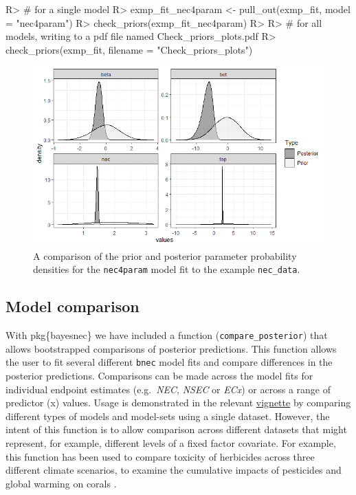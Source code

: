 \documentclass[
]{jss}
\begin{document}
\begin{CodeChunk}
\begin{CodeInput}
R> # for a single model
R> exmp_fit_nec4param <- pull_out(exmp_fit, model = "nec4param")
R> check_priors(exmp_fit_nec4param)
R> 
R> # for all models, writing to a pdf file named Check_priors_plots.pdf
R> check_priors(exmp_fit, filename = "Check_priors_plots")
\end{CodeInput}
\end{CodeChunk}

\begin{figure}
\centering
\includegraphics{check_prior.png}
\caption{A comparison of the prior and posterior parameter probability
densities for the \texttt{nec4param} model fit to the example
\texttt{nec\_data}.\label{fig:checkpriorsplot}}
\end{figure}

\hypertarget{model-comparison}{%
\subsection{Model comparison}\label{model-comparison}}

With pkg\{bayesnec\} we have included a function
(\texttt{compare\_posterior}) that allows bootstrapped comparisons of
posterior predictions. This function allows the user to fit several
different \texttt{bnec} model fits and compare differences in the
posterior predictions. Comparisons can be made across the model fits for
individual endpoint estimates (e.g.~\emph{NEC}, \emph{NSEC} or
\emph{ECx}) or across a range of predictor (x) values. Usage is
demonstrated in the relevant
\href{https://open-aims.github.io/bayesnec/articles/example4.html}{vignette}
by comparing different types of models and model-sets using a single
dataset. However, the intent of this function is to allow comparison
across different datasets that might represent, for example, different
levels of a fixed factor covariate. For example, this function has been
used to compare toxicity of herbicides across three different climate
scenarios, to examine the cumulative impacts of pesticides and global
warming on corals \citep{flores2021}.
\end{document}
